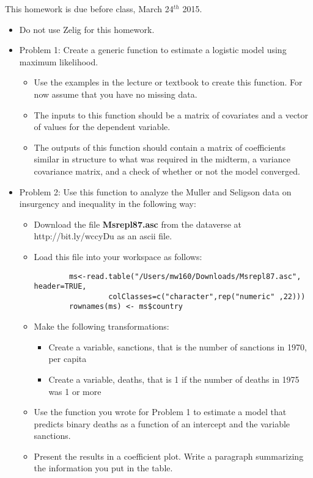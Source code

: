 \documentclass[10pt,letter]{article}
\title{}
\author{}
\date{\today}
\begin{document}
This homework is due before class, March 24$^{th}$ 2015. 

\begin{itemize}
\item Do not use Zelig for this homework.
\item Problem 1: Create a generic function to estimate a logistic model using maximum likelihood.
	\begin{itemize}
		\item Use the examples in the lecture or textbook to create this function. For now assume that you have no missing data. 
		\item The inputs to this function should be a matrix of covariates and a vector of values for the dependent variable.
		\item The outputs of this function should contain a matrix of coefficients similar in structure to what was required in the midterm, a variance covariance matrix, and a check of whether or not the model converged.
	\end{itemize}
\item Problem 2: Use this function to analyze the Muller and Seligson data on insurgency and inequality in the following way:
	\begin{itemize}
		\item Download the file \textbf{Msrepl87.asc} from the dataverse at http://bit.ly/wccyDu as an ascii file.
		\item Load this file into your workspace as follows:
		\begin{verbatim}
		ms<-read.table("/Users/mw160/Downloads/Msrepl87.asc", header=TRUE, 
			     colClasses=c("character",rep("numeric" ,22)))
		rownames(ms) <- ms$country
		\end{verbatim}
		\item Make the following transformations:
		\begin{itemize}
			\item Create a variable, sanctions, that is the number of sanctions in 1970, per capita
			\item Create a variable, deaths, that is 1 if the number of deaths in 1975 was 1 or more
		\end{itemize}
		\item Use the function you wrote for Problem 1 to estimate a model that predicts binary deaths as a function of an intercept and the variable sanctions.
		\item Present the results in a coefficient plot. Write a paragraph summarizing the information you put in the table.

\end{itemize}
\end{itemize}
\end{document}
